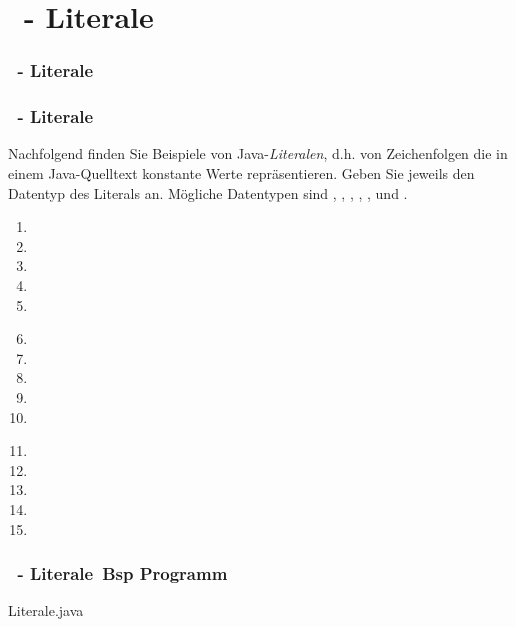 \def\stitle{\theexercise\ - Literale}
\section{\stitle}
\begin{frame}%
  \frametitle{\stitle}%
\tableofcontents[current]
\end{frame}

\begin{frame}[fragile]%
  \frametitle{\stitle}%


Nachfolgend finden Sie Beispiele von Java-\emph{Literalen}, d.h. von Zeichenfolgen die in einem Java-Quelltext konstante Werte repräsentieren.
Geben Sie jeweils den Datentyp des Literals an.
Mögliche Datentypen sind , , , , ,  und .

\begin{center}

\begin{minipage}{0.3\textwidth}
\begin{enumerate}
\item {}
\item {}
\item {}
\item {}
\item {}
\end{enumerate}
\end{minipage}
\hfill
\begin{minipage}{0.3\textwidth}
\begin{enumerate}
\setcounter{enumi}{5}
\item {}
\item {}
\item {}
\item {}
\item {}
\end{enumerate}
\end{minipage}
\hfill
\begin{minipage}{0.3\textwidth}
\begin{enumerate}
\setcounter{enumi}{10}
\item {}
\item {}
\item {}
\item {}
\item {}
\end{enumerate}
\end{minipage}

\end{center}
\end{frame}


\begin{frame}[t]%
  \frametitle{\stitle\, Bsp Programm}%


{\getexercisefolder Literale.java}
\end{frame}
